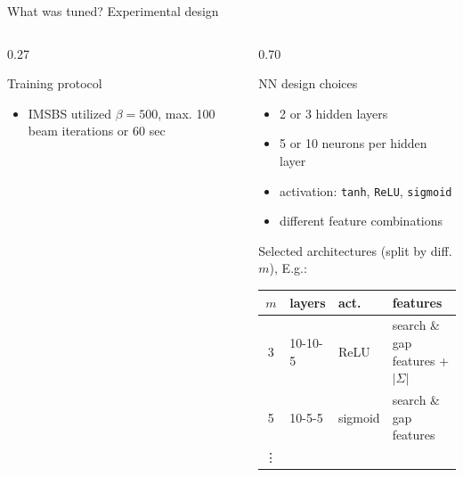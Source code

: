 \documentclass{beamer}
\begin{document}
\begin{frame}{What was tuned? Experimental design}
\small
\begin{columns}[T,totalwidth=\textwidth]
\begin{column}{0.27\textwidth}

\begin{block}{Training protocol}
\begin{itemize}
\item   IMSBS utilized $\beta=500$, max. 100 beam iterations or 60 sec
\end{itemize}
\end{block}
\end{column}

\begin{column}{0.70\textwidth}
\begin{block}{NN design choices}
\begin{itemize}
\item 2 or 3 hidden layers
\item 5 or 10 neurons per hidden layer
\item activation: \texttt{tanh}, \texttt{ReLU}, \texttt{sigmoid}
\item different feature combinations %
\end{itemize}
\end{block}
\begin{block}{Selected architectures (split by diff. $m$), E.g.:}
\begin{tabular}{c|l|l|l}
$m$ & layers & act. & features \\\hline
3 & 10-10-5 & ReLU & search \& gap features + $|\Sigma|$ \\
5 & 10-5-5 & sigmoid & search \& gap features\\
\vdots &             & 
\end{tabular}
\end{block}
\end{column}
\end{columns}
\end{frame}
\end{document}
